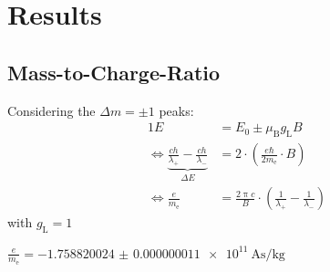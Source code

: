 \chapter{Results}
\section{Mass-to-Charge-Ratio}


Considering the $\Delta m = \pm 1$ peaks:
\begin{alignat}{1}
	E &= E_0 \pm \mu_\text{B} g_\text{L} B\\
	\Leftrightarrow \underbrace{\frac{c h}{\lambda_+} - \frac{c h}{\lambda_-}}_{\Delta E} &=
	2 \cdot \left(\frac{e \hbar}{2 m_\text{e}} \cdot B \right)\\
	\Leftrightarrow \frac{e}{m_\text{e}} &= \frac{2 \uppi c}{B} \cdot \left(\frac{1}{\lambda_+} - \frac{1}{\lambda_-}\right)
\end{alignat}
with $g_\text{L} = 1$

$\frac{e}{m_\text{e}} = \SI{-1.758820024(11)e11}{\ampere\second\per\kilo\gram}$
